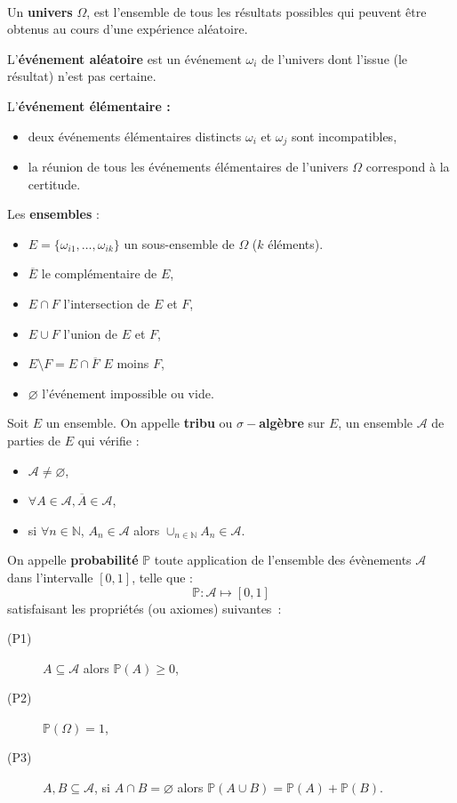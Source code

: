 
\begin{f}[Axiomatique]{\ }
	
	Un \textbf{univers} $\Omega$, est l'ensemble de tous les résultats possibles qui peuvent être obtenus au cours d'une expérience aléatoire.
	
	L'\textbf{événement aléatoire} est un événement $\omega_i$ de l'univers dont l'issue (le résultat) n'est pas certaine.
	
	
	L'\textbf{événement élémentaire :}
	\begin{itemize}
		\item deux événements élémentaires distincts $\omega_i$ et $\omega_j$ sont incompatibles,
		\item la réunion de tous les événements élémentaires de l'univers $\Omega $ correspond à la certitude.
	\end{itemize}
	
	Les \textbf{ensembles} :
	\begin{itemize}
		\item  $E=\lbrace \omega_{i1},\ldots , \omega_{ik}\rbrace$ un sous-ensemble de $\Omega$ ($k$ éléments).
		\item $\overline{E}$ le complémentaire de $E$,
		\item $E\cap F$ l'intersection de $E$ et $F$,
		\item $E\cup F$ l'union de $E$ et $F$,
		\item $E\setminus F= E\cap\overline{F}$  $E$ moins $F$,
		\item $\varnothing$ l'événement impossible ou vide.
	\end{itemize}
	
	Soit $E$ un ensemble. On appelle \textbf{tribu} ou \textbf{$\sigma-$algèbre} sur $E$, un ensemble $\mathcal{A}$ de parties de $E$ qui vérifie :
	\begin{itemize}
		\item     $\mathcal{A} \not=\varnothing$,
		\item     $\forall A \in \mathcal{A} , \overline{A} \in\mathcal{A}$,
		\item     si $\forall n \in \mathbb{N}$, $A_n \in\mathcal{A}$ alors $\cup_{n\in\mathbb{N} } A_n \in\mathcal{A}$.
	\end{itemize}
	
	On appelle \textbf{probabilité} $\mathbb{P}$ toute application de l'ensemble des évènements $\mathcal{A}$ dans l'intervalle $[0,1]$, telle que :      $$\mathbb{P} :      \mathcal{A}  \mapsto   [0,1]$$
	satisfaisant les propriétés (ou axiomes) suivantes~:
	\begin{description}
		\item[(P1)] $A \subseteq \mathcal{A} $    alors  $ \mathbb{P}(A) \geq 0$,
		\item[(P2)] $ \mathbb{P}(\Omega) = 1$,
		\item[(P3)] $A, B \subseteq \mathcal{A}$,  si  $A\cap B =\varnothing$    alors   $\mathbb{P}(A\cup B)=\mathbb{P}(A) + \mathbb{P}(B)$.
	\end{description}
	

\end{f}
